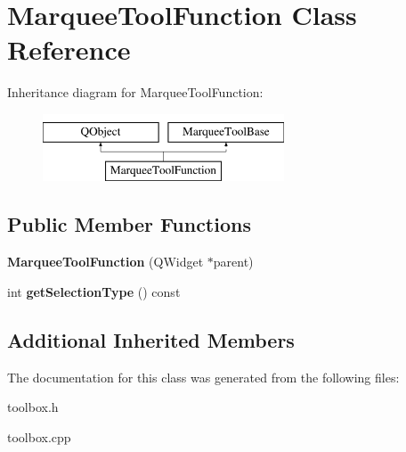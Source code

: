 \hypertarget{class_marquee_tool_function}{\section{Marquee\-Tool\-Function Class Reference}
\label{class_marquee_tool_function}
}
Inheritance diagram for Marquee\-Tool\-Function\-:\begin{figure}[H]
\begin{center}
\leavevmode
\includegraphics[height=2.000000cm]{class_marquee_tool_function}
\end{center}
\end{figure}
\subsection*{Public Member Functions}
\begin{DoxyCompactItemize}
\item 
\hypertarget{class_marquee_tool_function_a323f617feb6f5d0f3184855566856610}{{\bfseries Marquee\-Tool\-Function} (Q\-Widget $\ast$parent)}\label{class_marquee_tool_function_a323f617feb6f5d0f3184855566856610}

\item 
\hypertarget{class_marquee_tool_function_a56c0c5d191a8139627b4ccaf1d44bf9f}{int {\bfseries get\-Selection\-Type} () const }\label{class_marquee_tool_function_a56c0c5d191a8139627b4ccaf1d44bf9f}

\end{DoxyCompactItemize}
\subsection*{Additional Inherited Members}


The documentation for this class was generated from the following files\-:\begin{DoxyCompactItemize}
\item 
toolbox.\-h\item 
toolbox.\-cpp\end{DoxyCompactItemize}
